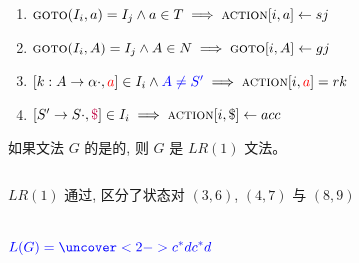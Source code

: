 \begin{frame}{}
  \begin{center}

    \vspace{0.60cm}
    \begin{enumerate}[(1)]
      \setlength{\itemsep}{25pt}
      \item $\textsc{goto}(I_{i}, a) = I_{j} \land a \in T \implies \textsc{action}[i, a] \gets sj$
      \item $\textsc{goto}(I_{i}, A) = I_{j} \land A \in N \implies \textsc{goto}[i, A] \gets gj$
      \item $[k: A \to \alpha \cdot, \textcolor{red}{a}] \in I_{i} \land \textcolor{blue}{A \neq S'} \implies
        \textsc{action}[i, \textcolor{red}{a}] = rk$
      \item $[S' \to S \cdot, \textcolor{purple}{\$}] \in I_{i} \implies \textsc{action}[i, \$] \gets acc$
    \end{enumerate}

    \pause
    \vspace{0.20cm}
    \begin{definition}[$LR(1)$文法]
      如果文法 $G$ 的是的,
      则 $G$ 是 $LR(1)$ 文法。
    \end{definition}
  \end{center}
\end{frame}

\begin{frame}{}
  \begin{center}
    \begin{columns}
    \end{columns}

    \vspace{0.60cm}
    $LR(1)$ 通过, 区分了状态对 $(3, 6)$, $(4, 7)$ 与 $(8, 9)$
  \end{center}
\end{frame}

\begin{frame}{}
  \begin{center}
    \begin{columns}


        \[
          \blue{L(G) = \uncover<2->{c^{\ast}dc^{\ast}d}}
        \]
    \end{columns}
  \end{center}
\end{frame}

